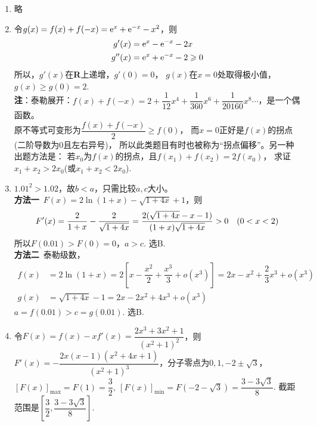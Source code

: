 \begin{enumerate}[label={\textbf{\arabic*.}},leftmargin=
    \inteval{\myenumleftmargin}pt]
\item 
略

\item 令$ g(x)=f(x)+f(-x)=\mathrm{e}^x+\mathrm{e}^{-x}-x^2 $，则
\begin{align*}
    g'(x) &=\mathrm{e}^x-\mathrm{e}^{-x}-2x \\
    g''(x) &=\mathrm{e}^x+\mathrm{e}^{-x}-2\geqslant 0 
\end{align*}
所以，$ g'(x) $在\textbf{R}上递增，$ g'(0)=0 $，
$ g(x) $在$ x=0 $处取得极小值，$ g(x)\geq g(0)=2 $. \\
\textbf{注}：泰勒展开：$ f(x)+f(-x)=2+\dfrac{1}{12}x^4+\dfrac{1}{360}x^6+
\dfrac{1}{20160}x^8\cdots $，是一个偶函数。\\
原不等式可变形为$ \dfrac{f(x)+f(-x)}{2}\geq f(0) $，
而$ x=0 $正好是$ f(x) $的拐点(二阶导数为0且左右异号)，
所以此类题目有时也被称为“拐点偏移”。另一种出题方法是：
若$ x_0 $为$ f(x) $的拐点，且$ f(x_1)+f(x_2)=2f(x_0) $，
求证$ x_1+x_2>2x_0 $(或$ x_1+x_2< 2x_0 $).

\item $1.01^{2}>1.02$，故$b<a$，只需比较$ a,c $大小。\\
\textbf{方法一}\ $ F(x)=2\ln(1+x)-\sqrt{1+4x}+1 $，则
\begin{gather*}
    F'(x)=\dfrac{2}{1+x}-\dfrac{2}{\sqrt{1+4x}}=
    \dfrac{2(\sqrt{1+4x}-x-1)}{(1+x)\sqrt{1+4x}}>0 \quad (0<x<2)
\end{gather*}
所以$ F(0.01)>F(0)=0 $，$ a>c $. 选B. \\
\textbf{方法二}\ 泰勒级数，
\begin{align*}
    f(x) &=2\ln(1+x)=2\left[x-\dfrac{x^{2}}{2}+\dfrac{x^3}{3}+
    o\left(x^{3}\right) \right]=2x-x^2+\dfrac{2}{3}x^3+o(x^3) \\
    g(x) &=\sqrt{1+4x}-1=2x-2x^2+4x^3+o(x^3)
\end{align*}
$ a=f(0.01)>c=g(0.01) $. 选B.

\item 
令$ F(x)=f(x)-xf'(x)=\dfrac{2x^3+3x^2+1}{(x^2+1)^2} $，则
$ F'(x)=-\dfrac{2x(x-1)(x^2+4x+1)}{(x^2+1)^3} $，分子零点为$ 0, 1,
-2\pm \sqrt{3} $，$ [F(x)]_{\max}=F(1)=\dfrac{3}{2},\ 
[F(x)]_{\min}=F(-2-\sqrt{3})=\dfrac{3-3\sqrt{3}}{8} $.
截距范围是$ \left[\dfrac{3}{2},\dfrac{3-3\sqrt{3}}{8}\right] $.


\end{enumerate}
